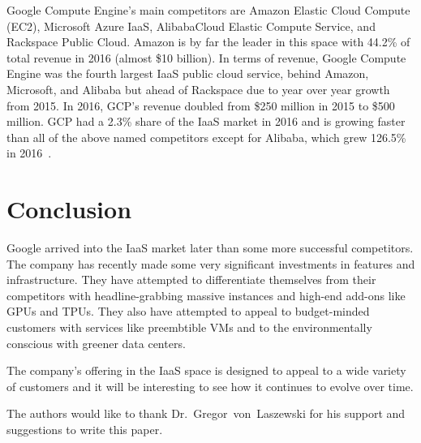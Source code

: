 Google Compute Engine's main competitors are Amazon Elastic Cloud
Compute (EC2), Microsoft Azure IaaS, AlibabaCloud Elastic Compute
Service, and Rackspace Public Cloud. Amazon is by far the leader in
this space with 44.2\% of total revenue in 2016 (almost \$10
billion). In terms of revenue, Google Compute Engine was the fourth
largest IaaS public cloud service, behind Amazon, Microsoft, and
Alibaba but ahead of Rackspace due to year over year growth from
2015. In 2016, GCP's revenue doubled from \$250 million in 2015
to \$500 million. GCP had a 2.3\% share of the IaaS market in 2016 and
is growing faster than all of the above named competitors except for
Alibaba, which grew 126.5\% in 2016~\cite{hid-sp18-419-gartnerpr2017}.


\section{Conclusion}

Google arrived into the IaaS market later than some more successful
competitors. The company has recently made some very significant
investments in features and infrastructure. They have attempted to
differentiate themselves from their competitors with headline-grabbing
massive instances and high-end add-ons like GPUs and TPUs. They also
have attempted to appeal to budget-minded customers with services like
preembtible VMs and to the environmentally conscious with greener data
centers.

The company's offering in the IaaS space is designed to appeal to a wide variety of customers and it will be interesting to see how it continues to evolve over time. 


\begin{acks}

  The authors would like to thank Dr.~Gregor~von~Laszewski for his
  support and suggestions to write this paper.

\end{acks}


 

